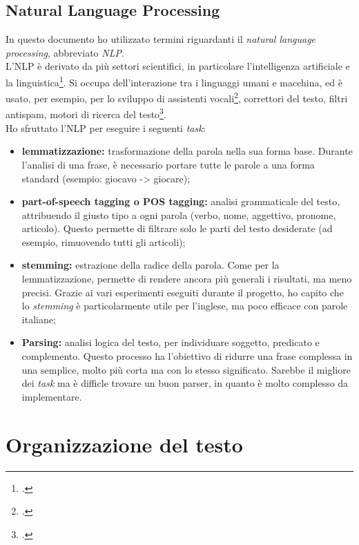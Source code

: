\subsection{Natural Language Processing}
In questo documento ho utilizzato termini riguardanti il \textit{natural language processing}, abbreviato \textit{NLP}.\\ 
L'NLP è derivato da più settori scientifici, in particolare l'intelligenza artificiale e la linguistica\footcite{site:nlp}. Si occupa dell'interazione tra i linguaggi umani e macchina, ed è usato, per esempio, per lo sviluppo di assistenti vocali\footcite{alexanlu}, correttori del testo, filtri antispam, motori di ricerca del testo\footcite{site:nlpexamples}.\\
Ho sfruttato l'NLP per eseguire i seguenti \textit{task}:
\begin{itemize}
    \item \textbf{lemmatizzazione:} trasformazione della parola nella sua forma base. Durante l'analisi di una frase, è necessario portare tutte le parole a una forma standard (esempio: giocavo -> giocare);
    \item \textbf{part-of-speech tagging o POS tagging:} analisi grammaticale del testo, attribuendo il giusto tipo a ogni parola (verbo, nome, aggettivo, pronome, articolo). Questo permette di filtrare solo le parti del testo desiderate (ad esempio, rimuovendo tutti gli articoli);
    \item \textbf{stemming:} estrazione della radice della parola. Come per la lemmatizzazione, permette di rendere ancora più generali i risultati, ma meno precisi. Grazie ai vari esperimenti eseguiti durante il progetto, ho capito che lo \textit{stemming} è particolarmente utile per l'inglese, ma poco efficace con parole italiane;
    \item \textbf{Parsing:} analisi logica del testo, per individuare soggetto, predicato e complemento. Questo processo ha l'obiettivo di ridurre una frase complessa in una semplice, molto più corta ma con lo stesso significato. Sarebbe il migliore dei \textit{task} ma è difficle trovare un buon parser, in quanto è molto complesso da implementare.
\end{itemize}

\section{Organizzazione del testo}

